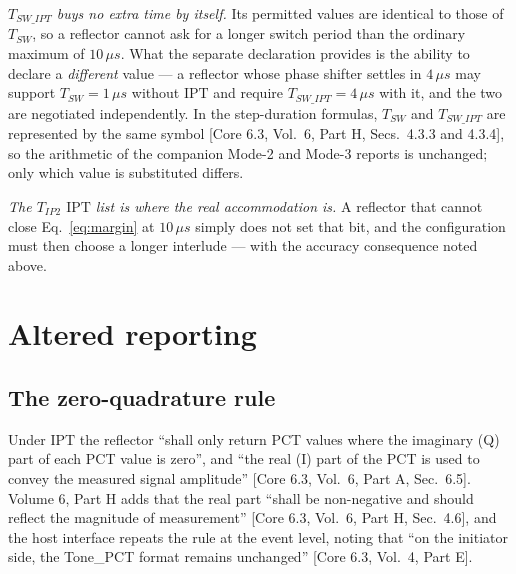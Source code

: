 \documentclass[11pt,a4paper]{article}
\newcommand{\us}{\,\ensuremath{\upmu}s}
\newcommand{\IPT}{\ensuremath{\mathrm{IPT}}}
\newcommand{\Tsw}{T_{SW}}
\newcommand{\Tswipt}{T_{SW\_IPT}}
\newcommand{\Tiptwo}{T_{IP2}}
\providecommand{\upmu}{\mu}
\newcommand{\core}[1]{\textcolor{rulegrey}{\small[Core 6.3, #1]}}
\begin{document}
\emph{$\Tswipt$ buys no extra time by itself.} Its permitted values are identical to those of
$\Tsw$, so a reflector cannot ask for a longer switch period than the ordinary maximum of $10\us$.
What the separate declaration provides is the ability to declare a \emph{different} value --- a
reflector whose phase shifter settles in $4\us$ may support $\Tsw = 1\us$ without \IPT{} and require
$\Tswipt = 4\us$ with it, and the two are negotiated independently. In the step-duration formulas,
$\Tsw$ and $\Tswipt$ are represented by the same symbol \core{Vol.\ 6, Part H, Secs.\ 4.3.3
and 4.3.4}, so the arithmetic of the companion Mode-2 and Mode-3 reports is unchanged; only which
value is substituted differs.

\emph{The $\Tiptwo$ \IPT{} list is where the real accommodation is.} A reflector that cannot close
Eq.~\eqref{eq:margin} at $10\us$ simply does not set that bit, and the configuration must then choose
a longer interlude --- with the accuracy consequence noted above.

\section{Altered reporting}
\label{sec:report}

\subsection{The zero-quadrature rule}

Under \IPT{} the reflector ``shall only return PCT values where the imaginary (Q) part of each PCT
value is zero'', and ``the real (I) part of the PCT is used to convey the measured signal amplitude''
\core{Vol.\ 6, Part A, Sec.\ 6.5}. Volume 6, Part H adds that the real part ``shall be non-negative
and should reflect the magnitude of measurement'' \core{Vol.\ 6, Part H, Sec.\ 4.6}, and the host
interface repeats the rule at the event level, noting that ``on the initiator side, the Tone\_PCT
format remains unchanged'' \core{Vol.\ 4, Part E}.
\end{document}
